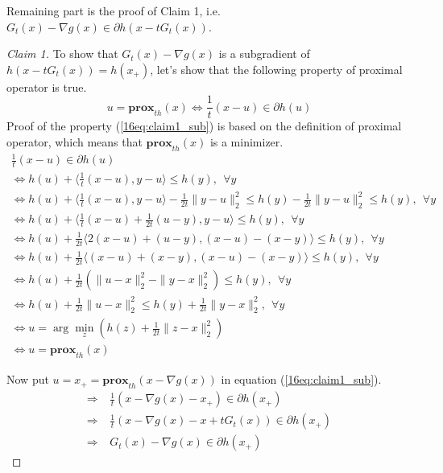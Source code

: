 \documentclass[12pt]{report}
\begin{document}
Remaining part is the proof of Claim 1, i.e. $G_t (x)- \nabla g(x) \in \partial h(x-tG_t (x))$.

\begin{proof}[Claim 1]
To show that $G_t(x)-\nabla g(x)$ is a subgradient of $h(x-tG_t(x))=h(x_+)$, let's show that the following property of proximal operator is true.
\begin{equation}\label{16eq:claim1_sub}
u=\textbf{prox}_{th}(x) \Leftrightarrow \frac{1}{t}(x-u) \in \partial h(u)
\end{equation}
Proof of the property (\ref{16eq:claim1_sub}) is based on the definition of proximal operator, which means that $\textbf{prox}_{th}(x)$ is a minimizer.
\begin{gather*}
\frac{1}{t}(x-u) \in \partial h(u)\\
\Leftrightarrow h(u)+\langle \frac{1}{t}(x-u),y-u \rangle \leq h(y), ~~\forall y\\
\Leftrightarrow h(u)+\langle \frac{1}{t}(x-u), y-u \rangle -\frac{1}{2t}\|y-u\|_2^2 \leq h(y)-\frac{1}{2t}\|y-u\|_2^2 \leq h(y), ~~\forall y\\
\Leftrightarrow h(u) + \langle \frac{1}{t}(x-u)+\frac{1}{2t}(u-y),y-u \rangle \leq h(y), ~~\forall y\\
\Leftrightarrow h(u)+\frac{1}{2t}\langle 2(x-u) +(u-y), (x-u)-(x-y) \rangle \leq h(y),~~\forall y\\
\Leftrightarrow h(u)+\frac{1}{2t}\langle (x-u) +(x-y), (x-u)-(x-y) \rangle \leq h(y),~~\forall y\\
\Leftrightarrow h(u)+\frac{1}{2t}\left(\|u-x\|_2^2-\|y-x\|_2^2 \right) \leq h(y),~~\forall y\\
\Leftrightarrow h(u)+\frac{1}{2t}\|u-x\|_2^2 \leq h(y)+\frac{1}{2t}\|y-x\|_2^2,~~\forall y\\
\Leftrightarrow u = \arg\min_{z} \left( h(z)+\frac{1}{2t}\|z-x\|_2^2 \right)\\
\Leftrightarrow u=\textbf{prox}_{th}(x)
\end{gather*}

Now put $u=x_+ = \textbf{prox}_{th}(x-\nabla g(x))$ in equation (\ref{16eq:claim1_sub}).
\begin{align*}
\Rightarrow ~&\frac{1}{t}(x-\nabla g(x) - x_+) \in \partial h(x_+)\\
\Rightarrow ~&\frac{1}{t}(x-\nabla g(x) - x+tG_t(x)) \in \partial h(x_+)\\
\Rightarrow ~&G_t(x) -\nabla g(x) \in \partial h(x_+)
\end{align*}

\end{proof}
\end{document}
